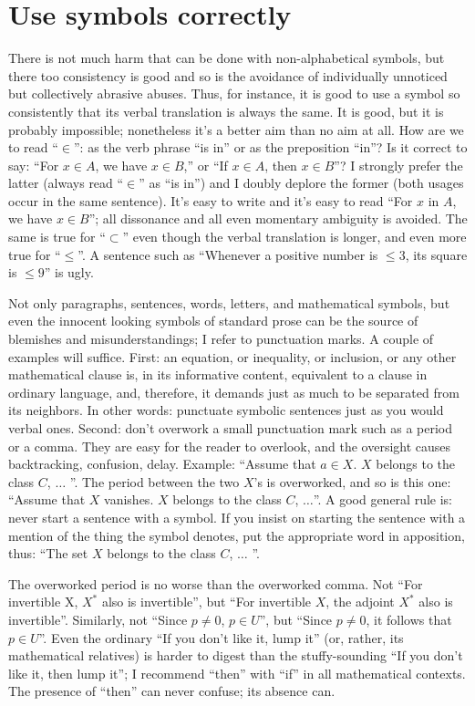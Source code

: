 \documentclass[12pt]{article}
\begin{document}
\section{Use symbols correctly}

There is not much harm that can be done with non-alphabetical symbols, but there too consistency is good and so is the avoidance of individually unnoticed but collectively abrasive abuses. Thus, for instance, it is good to use a symbol so consistently that its verbal translation is always the same. It is good, but it is probably impossible; nonetheless it's a better aim than no aim at all. How are we to read ``$\in$'': as the verb phrase ``is in'' or as the preposition ``in''? Is it correct to say: ``For $x\in A$, we have $x\in B$,'' or ``If $x\in A$, then $x\in B$''? I strongly prefer the latter (always read ``$\in$'' as ``is in'') and I doubly deplore the former (both usages occur in the same sentence). It's easy to write and it's easy to read ``For $x$ in $A$, we have $x\in B$''; all dissonance and all even momentary ambiguity is avoided. The same is true for ``$\subset$'' even though the verbal translation is longer, and even more true for ``$\le$''. A sentence such as ``Whenever a positive number is $\le3$, its square is $\le9$'' is ugly. 

Not only paragraphs, sentences, words, letters, and mathematical symbols, but even the innocent looking symbols of standard prose can be the source of blemishes and misunderstandings; I refer to punctuation marks. A couple of examples will suffice. First: an equation, or inequality, or inclusion, or any other mathematical clause is, in its informative content, equivalent to a clause in ordinary language, and, therefore, it demands just as much to be separated from its neighbors. In other words: punctuate symbolic sentences just as you would verbal ones. Second: don't overwork a small punctuation mark such as a period or a comma. They are easy for the reader to overlook, and the oversight causes backtracking, confusion, delay. Example: ``Assume that $a \in X$. $X$ belongs to the class $C$, $\dots$ ''. The period between the two $X$'s is overworked, and so is this one: ``Assume that $X$ vanishes. $X$ belongs to the class $C$, $\dots$''. A good general rule is: never start a sentence with a symbol. If you insist on starting the sentence with a mention of the thing the symbol denotes, put the appropriate word in apposition, thus: ``The set $X$ belongs to the class $C$, $\dots$ ''. 

The overworked period is no worse than the overworked comma. Not ``For invertible X, $X^{*}$ also is invertible'', but ``For invertible $X$, the adjoint $X^{*}$ also is invertible''. Similarly, not ``Since $p\ne0$, $p\in U$'', but ``Since $p\ne0$, it follows that $p\in U$''. Even the ordinary ``If you don't like it, lump it'' (or, rather, its mathematical relatives) is harder to digest than the stuffy-sounding ``If you don't like it, then lump it''; I recommend ``then'' with ``if'' in all mathematical contexts. The presence of ``then'' can never confuse; its absence can. 
\end{document}
